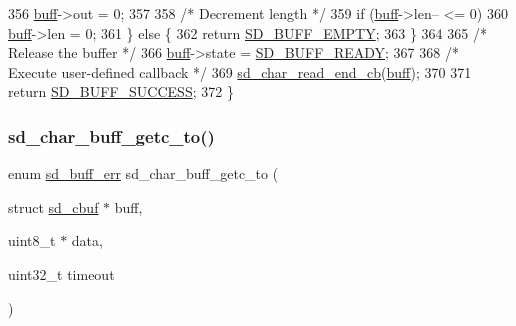\begin{DoxyCode}
356             \mbox{\hyperlink{structsd__cbuf_a8b212742c92a124f2eb4a244acc19f7c}{buff}}->out = 0;
357         
358         \textcolor{comment}{/* Decrement length */}
359         \textcolor{keywordflow}{if} (\mbox{\hyperlink{structsd__cbuf_a8b212742c92a124f2eb4a244acc19f7c}{buff}}->len-- <= 0)
360             \mbox{\hyperlink{structsd__cbuf_a8b212742c92a124f2eb4a244acc19f7c}{buff}}->len = 0;
361     \} \textcolor{keywordflow}{else} \{
362         \textcolor{keywordflow}{return} \mbox{\hyperlink{group___s_d___buffer___types_gga012d8a07d989f00e3f9c4a2f62743de4ae7df9fe6e4740934def6178fe96c6f6f}{SD\_BUFF\_EMPTY}};
363     \}
364   
365     \textcolor{comment}{/* Release the buffer */}
366     \mbox{\hyperlink{structsd__cbuf_a8b212742c92a124f2eb4a244acc19f7c}{buff}}->state = \mbox{\hyperlink{group___s_d___buffer___types_gga52f14e9c7b7d9ba092e1cd615559012ba99d36bbc57255841b60f77f1a0059c7c}{SD\_BUFF\_READY}};
367   
368     \textcolor{comment}{/* Execute user-defined callback */}
369     \mbox{\hyperlink{group___s_d___buffer___functions_ga17d8b9804dc4f2cbfbf03a5c23d227e7}{sd\_char\_read\_end\_cb}}(\mbox{\hyperlink{structsd__cbuf_a8b212742c92a124f2eb4a244acc19f7c}{buff}});
370   
371     \textcolor{keywordflow}{return} \mbox{\hyperlink{group___s_d___buffer___types_gga012d8a07d989f00e3f9c4a2f62743de4a57815778d30aaa889a6e73dfc081e5f6}{SD\_BUFF\_SUCCESS}};
372 \}
\end{DoxyCode}
\mbox{\label{group___s_d___buffer___functions_ga13cfdea81509e25f3fa884cc373fac64}} 
\subsubsection{\texorpdfstring{sd\+\_\+char\+\_\+buff\+\_\+getc\+\_\+to()}{sd\_char\_buff\_getc\_to()}}
{\footnotesize\ttfamily enum \mbox{\hyperlink{group___s_d___buffer___types_ga012d8a07d989f00e3f9c4a2f62743de4}{sd\+\_\+buff\+\_\+err}} sd\+\_\+char\+\_\+buff\+\_\+getc\+\_\+to (\begin{DoxyParamCaption}\item[{struct \mbox{\hyperlink{structsd__cbuf}{sd\+\_\+cbuf}} $\ast$}]{buff,  }\item[{uint8\+\_\+t $\ast$}]{data,  }\item[{uint32\+\_\+t}]{timeout }\end{DoxyParamCaption})}



